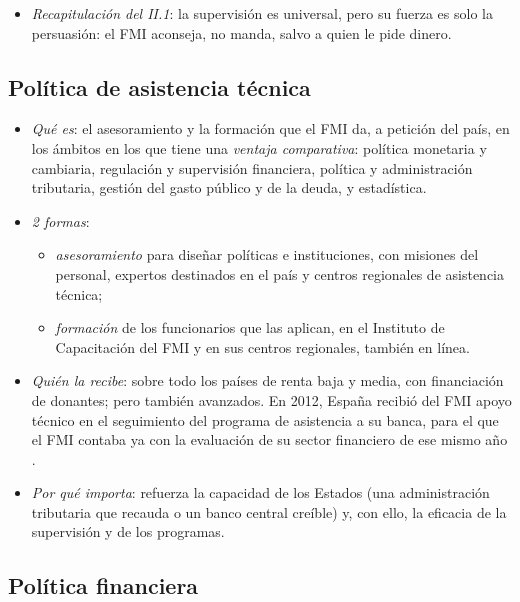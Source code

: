 \documentclass[11pt]{article}
\begin{document}
\begin{itemize}
\item \emph{Recapitulación del II.1}: la supervisión es universal, pero su fuerza es solo la persuasión: el FMI aconseja, no manda, salvo a quien le pide dinero.
\end{itemize}

\subsection{Política de asistencia técnica}\label{sec:asistencia}

\begin{itemize}
\item \emph{Qué es}: el asesoramiento y la formación que el FMI da, a petición del país, en los ámbitos en los que tiene una \emph{ventaja comparativa}: política monetaria y cambiaria, regulación y supervisión financiera, política y administración tributaria, gestión del gasto público y de la deuda, y estadística.
\item \emph{2 formas}:
  \begin{itemize}
  \item \emph{asesoramiento} para diseñar políticas e instituciones, con misiones del personal, expertos destinados en el país y centros regionales de asistencia técnica;
  \item \emph{formación} de los funcionarios que las aplican, en el Instituto de Capacitación del FMI y en sus centros regionales, también en línea.
  \end{itemize}
\item \emph{Quién la recibe}: sobre todo los países de renta baja y media, con financiación de donantes; pero también avanzados. En 2012, España recibió del FMI apoyo técnico en el seguimiento del programa de asistencia a su banca, para el que el FMI contaba ya con la evaluación de su sector financiero de ese mismo año\nocite{FMI2026InformeAnual} .
\item \emph{Por qué importa}: refuerza la capacidad de los Estados (una administración tributaria que recauda o un banco central creíble) y, con ello, la eficacia de la supervisión y de los programas.
\end{itemize}

\subsection{Política financiera}\label{sec:financiacion}
\end{document}
